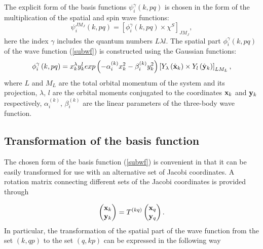 \documentclass[12pt,a4paper,twoside]{article}
\begin{document}
The explicit form of the basis functions $ \psi_{i}^{\gamma} \left(k, pq \right) $ is chosen in the form of the multiplication of the spatial and spin wave functions:
\begin{equation}
\psi_{i}^{JM_J}\left(k, pq \right) = \left[ \phi_{i}^{\gamma} \left(k, pq \right) 
\times \chi^{S} \right] _{JM_{J}},
\label{subwf}
\end{equation}
here the index $\gamma$ includes the quantum numbers $L \lambda l$. The spatial part $\phi_{i}^{\gamma} \left(k, pq \right) $ of the wave function (\ref {subwf}) is constructed using the Gaussian functions:
 \begin{equation}
 \phi_{i}^{\gamma} \left(k, pq \right) =
 x_{k}^{\lambda} y_{k}^{l} exp\left(- \alpha^{(k)}_{i} x_{k}^{2} - \beta^{(k)}_{i}  y_{k}^{2} \right) 
 \left[ Y_\lambda \left(  \hat{ \bf x}_k \right) \times Y_l \left( \hat{\bf y}_k \right) \right]_{LM_L},
 \end{equation}
where $ L $ and $ M_L $ are the total orbital momentum of the system and its projection, $ \lambda $, $ l $ are the orbital moments conjugated to the coordinates $ {\bf x} _k $ and $ {\bf y} _k $ respectively, $ \alpha^{(k)} _ {i} $, $ \beta^{(k)}_{i}$ are the linear parameters of the three-body wave function.
 \subsection{Transformation of the basis function }
 The chosen form of the basis function (\ref{subwf}) is convenient in that it can be easily transformed for use with an alternative set of Jacobi coordinates. A rotation matrix connecting different sets of the Jacobi coordinates is provided through
 
\begin{equation}
\begin{pmatrix}
{\bf x}_k \\ 
{\bf y}_k
\end{pmatrix}  = T^{(kq)}
\begin{pmatrix}
{\bf x}_q \\ 
{\bf y}_q
\end{pmatrix}.
\end{equation}
 In particular, the transformation of the spatial part of the wave function from the set $ \left(k, qp \right) $ to the set $ \left(q, kp \right) $ can be expressed in the following way
 
\end{document}
